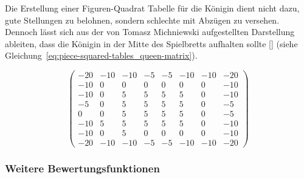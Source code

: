\bigskip

\noindent Die Erstellung einer Figuren-Quadrat Tabelle für die Königin dient nicht dazu, gute Stellungen zu belohnen, sondern schlechte mit Abzügen zu versehen.
Dennoch lässt sich aus der von Tomasz Michniewski aufgestellten Darstellung ableiten, dass die Königin in der Mitte des Spielbretts aufhalten sollte [\cite{Wiki2018}] (siehe Gleichung~\ref{eq:piece-squared-tables_queen-matrix}).

\begin{equation} \label{eq:piece-squared-tables_queen-matrix}
\begin{pmatrix}
-20 & -10 & -10 & -5 & -5 & -10 & -10 & -20 \\
-10 & 0 & 0 & 0 & 0 & 0 & 0 & -10 \\
-10 & 0 & 5 & 5 & 5 & 5 & 0 & -10 \\
-5 & 0 & 5 & 5 & 5 & 5 & 0 & -5 \\
0 & 0 & 5 & 5 & 5 & 5 & 0 & -5 \\
-10 & 5 & 5 & 5 & 5 & 5 & 0 & -10 \\
-10 & 0 & 5 & 0 & 0 & 0 & 0 & -10 \\
-20 & -10 & -10 & -5 & -5 & -10 & -10 & -20
\end{pmatrix}
\end{equation}


\subsubsection{Weitere Bewertungsfunktionen}

